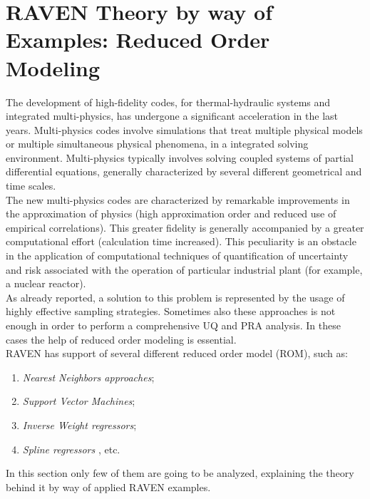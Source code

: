 \section{RAVEN Theory by way of Examples: Reduced Order Modeling}
The development of high-fidelity codes, for thermal-hydraulic systems 
and integrated multi-physics, has undergone a significant acceleration 
in the last years. Multi-physics codes involve simulations that treat 
multiple physical models or multiple simultaneous physical phenomena, 
in a integrated solving environment. Multi-physics typically involves 
solving coupled systems of partial differential equations, generally 
characterized by several different geometrical and time scales. 
\\The new multi-physics codes are characterized by remarkable 
improvements 
in the approximation of physics (high approximation order and reduced 
use of empirical correlations). This greater fidelity is generally 
accompanied by a greater computational effort (calculation time 
increased). This peculiarity is an 
obstacle in the application of  computational techniques of 
quantification of uncertainty and risk associated with the operation of 
particular industrial plant (for example, a nuclear reactor). 
\\As already reported, a solution to this problem is represented by the 
usage
of highly effective sampling strategies. Sometimes also these 
approaches is not enough
in order to perform a comprehensive UQ and PRA analysis. In these 
cases the help of reduced order modeling is essential.
\\RAVEN has support of several different reduced order model (ROM), 
such as:
\begin{enumerate}
  \item \textit{Nearest Neighbors approaches};
  \item \textit{Support Vector Machines};
  \item \textit{Inverse Weight regressors};
  \item \textit{Spline regressors }, etc.
\end{enumerate}
In this section only few of them are going to be analyzed, explaining the theory behind it
by way of applied RAVEN examples.


